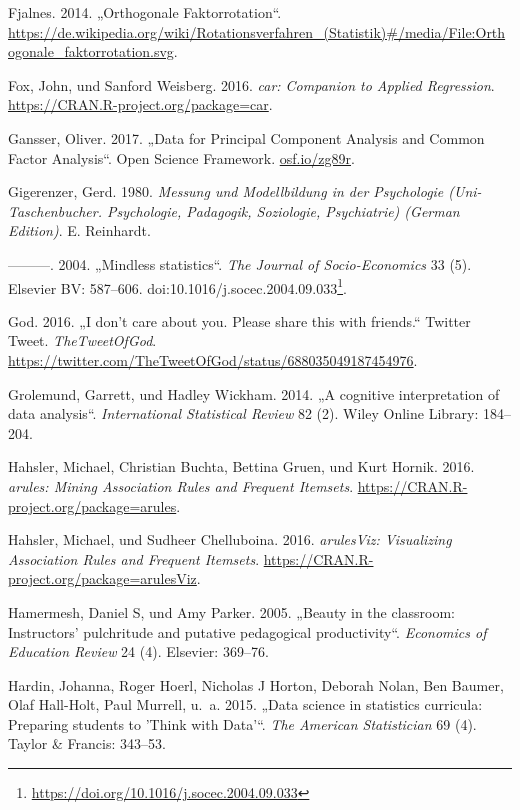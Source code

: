 \documentclass[12pt,ngerman,]{book}
\let\rmarkdownfootnote\footnote%
\def\footnote{\protect\rmarkdownfootnote}
\renewcommand{\href}[2]{#2\footnote{\url{#1}}}
\theoremstyle{definition}
\theoremstyle{definition}
\theoremstyle{remark}
\begin{document}
\hypertarget{ref-fjalnes_orthogonale_2014}{}
Fjalnes. 2014. „Orthogonale Faktorrotation``.
\url{https://de.wikipedia.org/wiki/Rotationsverfahren_(Statistik)\#/media/File:Orthogonale_faktorrotation.svg}.

\hypertarget{ref-R-car}{}
Fox, John, und Sanford Weisberg. 2016. \emph{car: Companion to Applied
Regression}. \url{https://CRAN.R-project.org/package=car}.

\hypertarget{ref-Gansser_2017}{}
Gansser, Oliver. 2017. „Data for Principal Component Analysis and Common
Factor Analysis``. Open Science Framework. \url{osf.io/zg89r}.

\hypertarget{ref-gigerenzer1980}{}
Gigerenzer, Gerd. 1980. \emph{Messung und Modellbildung in der
Psychologie (Uni-Taschenbucher. Psychologie, Padagogik, Soziologie,
Psychiatrie) (German Edition)}. E. Reinhardt.

\hypertarget{ref-Gigerenzer2004}{}
---------. 2004. „Mindless statistics``. \emph{The Journal of
Socio-Economics} 33 (5). Elsevier BV: 587--606.
doi:\href{https://doi.org/10.1016/j.socec.2004.09.033}{10.1016/j.socec.2004.09.033}.

\hypertarget{ref-god_i_2016}{}
God. 2016. „I don't care about you. Please share this with friends.``
Twitter Tweet. \emph{TheTweetOfGod}.
\url{https://twitter.com/TheTweetOfGod/status/688035049187454976}.

\hypertarget{ref-grolemund2014cognitive}{}
Grolemund, Garrett, und Hadley Wickham. 2014. „A cognitive
interpretation of data analysis``. \emph{International Statistical
Review} 82 (2). Wiley Online Library: 184--204.

\hypertarget{ref-R-arules}{}
Hahsler, Michael, Christian Buchta, Bettina Gruen, und Kurt Hornik.
2016. \emph{arules: Mining Association Rules and Frequent Itemsets}.
\url{https://CRAN.R-project.org/package=arules}.

\hypertarget{ref-R-arulesViz}{}
Hahsler, Michael, und Sudheer Chelluboina. 2016. \emph{arulesViz:
Visualizing Association Rules and Frequent Itemsets}.
\url{https://CRAN.R-project.org/package=arulesViz}.

\hypertarget{ref-hamermesh2005beauty}{}
Hamermesh, Daniel S, und Amy Parker. 2005. „Beauty in the classroom:
Instructors' pulchritude and putative pedagogical productivity``.
\emph{Economics of Education Review} 24 (4). Elsevier: 369--76.

\hypertarget{ref-hardin2015data}{}
Hardin, Johanna, Roger Hoerl, Nicholas J Horton, Deborah Nolan, Ben
Baumer, Olaf Hall-Holt, Paul Murrell, u.~a. 2015. „Data science in
statistics curricula: Preparing students to 'Think with Data'``.
\emph{The American Statistician} 69 (4). Taylor \& Francis: 343--53.
\end{document}
